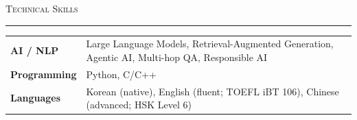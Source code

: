\documentclass[10pt,letterpaper]{article}
\newcommand{\sectionheading}[1]{%
  \vspace{12pt}%
  {\fontsize{10.95}{12.5}\selectfont\textsc{#1}}\par
  \vspace{1.5pt}\hrule\vspace{6pt}%
}
\begin{document}
\sectionheading{Technical Skills}
\begin{tabularx}{\textwidth}{@{}>{\bfseries}p{1.25in}Y@{}}
  AI / NLP & Large Language Models, Retrieval-Augmented Generation, Agentic AI, Multi-hop QA, Responsible AI \\
  Programming & Python, C/C++ \\
  Languages & Korean (native), English (fluent; TOEFL iBT 106), Chinese (advanced; HSK Level 6)
\end{tabularx}
\end{document}
